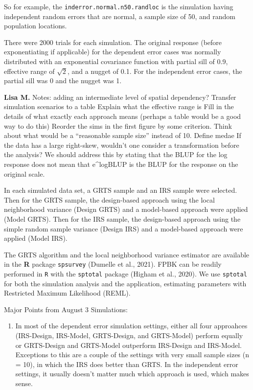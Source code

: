 \documentclass[]{elsarticle} %
\providecommand{\tightlist}{%
  \setlength{\itemsep}{0pt}\setlength{\parskip}{0pt}}
\begin{document}
So for example, the \texttt{inderror.normal.n50.randloc} is the
simulation having independent random errors that are normal, a sample
size of 50, and random population locations.

There were 2000 trials for each simulation. The original response
(before exponentiating if applicable) for the dependent error cases was
normally distributed with an exponential covariance function with
partial sill of 0.9, effective range of \(\sqrt{2}\), and a nugget of
0.1. For the independent error cases, the partial sill was 0 and the
nugget was 1.

\textbf{Lisa M.} Notes: adding an intermediate level of spatial
dependency? Transfer simulation scenarios to a table Explain what the
effective range is Fill in the details of what exactly each approach
means (perhaps a table would be a good way to do this) Reorder the sims
in the first figure by some criterion. Think about what would be a
``reasonable sample size'' instead of 10. Define medae If the data has a
large right-skew, wouldn't one consider a transformation before the
analysis? We should address this by stating that the BLUP for the log
response does not mean that e\^{}logBLUP is the BLUP for the response on
the original scale.

In each simulated data set, a GRTS sample and an IRS sample were
selected. Then for the GRTS sample, the design-based approach using the
local neighborhood variance (Design GRTS) and a model-based approach
were applied (Model GRTS). Then for the IRS sample, the design-based
approach using the simple random sample variance (Design IRS) and a
model-based approach were applied (Model IRS).

The GRTS algorithm and the local neighborhood variance estimator are
available in the \textbf{\textsf{R}} package \texttt{spsurvey} (Dumelle
et al., 2021). FPBK can be readily performed in \texttt{R} with the
\texttt{sptotal} package (Higham et al., 2020). We use \texttt{sptotal}
for both the simulation analysis and the application, estimating
parameters with Restricted Maximum Likelihood (REML).

Major Points from August 3 Simulations:

\begin{enumerate}
\def\labelenumi{\arabic{enumi}.}
\tightlist
\item
  In most of the dependent error simulation settings, either all four
  approahces (IRS-Design, IRS-Model, GRTS-Design, and GRTS-Model)
  perform equally or GRTS-Design and GRTS-Model outperform IRS-Design
  and IRS-Model. Exceptions to this are a couple of the settings with
  very small sample sizes (n = 10), in which the IRS does better than
  GRTS. In the independent error settings, it usually doesn't matter
  much which approach is used, which makes sense.
\end{enumerate}
\end{document}
